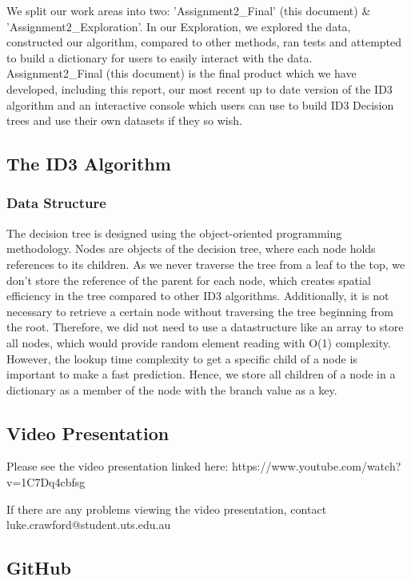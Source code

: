 \documentclass[11pt]{article}
\begin{document}
We split our work areas into two: 'Assignment2\_Final' (this document)
\& 'Assignment2\_Exploration'. In our Exploration, we explored the data,
constructed our algorithm, compared to other methods, ran tests and
attempted to build a dictionary for users to easily interact with the
data. Assignment2\_Final (this document) is the final product which we
have developed, including this report, our most recent up to date
version of the ID3 algorithm and an interactive console which users can
use to build ID3 Decision trees and use their own datasets if they so
wish.

\subsection{The ID3 Algorithm}\label{the-id3-algorithm}

\subsubsection{Data Structure}\label{data-structure}

The decision tree is designed using the object-oriented programming
methodology. Nodes are objects of the decision tree, where each node
holds references to its children. As we never traverse the tree from a
leaf to the top, we don't store the reference of the parent for each
node, which creates spatial efficiency in the tree compared to other ID3
algorithms. Additionally, it is not necessary to retrieve a certain node
without traversing the tree beginning from the root. Therefore, we did
not need to use a datastructure like an array to store all nodes, which
would provide random element reading with O(1) complexity. However, the
lookup time complexity to get a specific child of a node is important to
make a fast prediction. Hence, we store all children of a node in a
dictionary as a member of the node with the branch value as a key.

\subsection{Video Presentation}\label{video-presentation}

Please see the video presentation linked here:
https://www.youtube.com/watch?v=1C7Dq4cbfsg

If there are any problems viewing the video presentation, contact
luke.crawford@student.uts.edu.au

\subsection{GitHub}\label{github}
\end{document}

